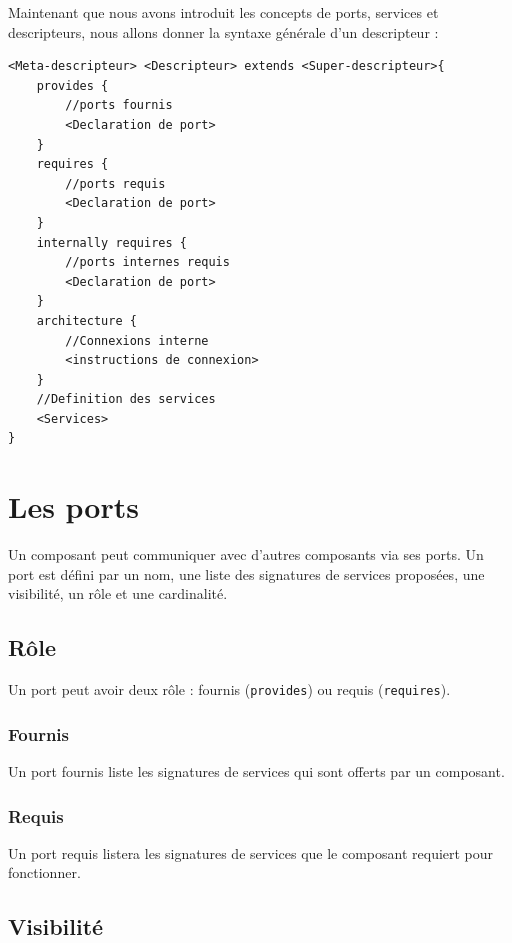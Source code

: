 \documentclass[11pt,a4paper,openany,oneside]{book}
\begin{document}
Maintenant que nous avons introduit les concepts de ports, services et descripteurs, nous allons donner la syntaxe générale d'un descripteur :
\begin{lstlisting}[language=Compo, frame=single, caption=Syntaxe générale d'un descripteur]
<Meta-descripteur> <Descripteur> extends <Super-descripteur>{
    provides {
        //ports fournis
        <Declaration de port>
    }
    requires {
        //ports requis
        <Declaration de port>
    }
    internally requires {
        //ports internes requis
        <Declaration de port>
    }
    architecture {
        //Connexions interne
        <instructions de connexion>
    }
    //Definition des services
    <Services>
}
\end{lstlisting}

\clearpage

\section{Les ports}

Un composant peut communiquer avec d'autres composants via ses ports. Un port est défini par un nom, une liste des signatures de services proposées, une visibilité, un rôle et une cardinalité.

\subsection{Rôle}

Un port peut avoir deux rôle : fournis (\texttt{provides}) ou requis (\texttt{requires}).

\subsubsection{Fournis}

Un port fournis liste les signatures de services qui sont offerts par un composant. 

\subsubsection{Requis}

Un port requis listera les signatures de services que le composant requiert pour fonctionner.

\subsection{Visibilité}
\end{document}
